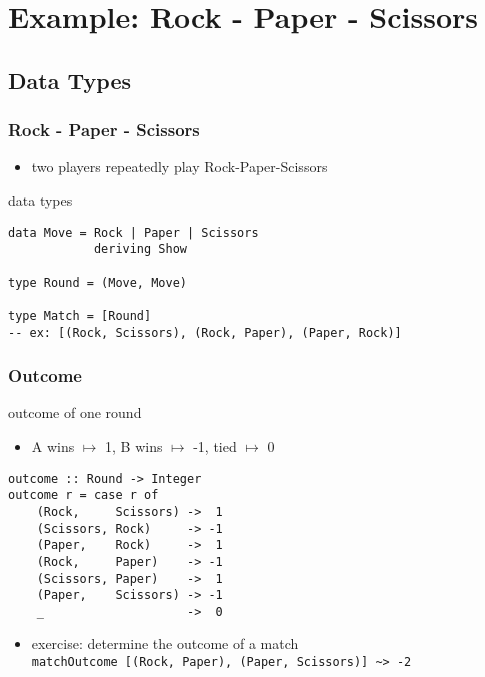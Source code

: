 \documentclass[dvipsnames]{beamer}
\theoremstyle{plain}
\begin{document}
\section{Example: Rock - Paper - Scissors}

\subsection{Data Types}

\begin{frame}[fragile]
  \frametitle{Rock - Paper - Scissors}

  \begin{itemize}
    \item two players repeatedly play Rock-Paper-Scissors
  \end{itemize}

  \begin{exampleblock}{data types}
    \begin{lstlisting}
data Move = Rock | Paper | Scissors
            deriving Show

type Round = (Move, Move)

type Match = [Round]
-- ex: [(Rock, Scissors), (Rock, Paper), (Paper, Rock)]
    \end{lstlisting}
  \end{exampleblock}
\end{frame}

\begin{frame}[fragile]
  \frametitle{Outcome}

  \begin{exampleblock}{outcome of one round}
    \begin{itemize}
      \item A wins $\mapsto$ 1, B wins $\mapsto$ -1, tied $\mapsto$ 0
    \end{itemize}
    \begin{lstlisting}
outcome :: Round -> Integer
outcome r = case r of
    (Rock,     Scissors) ->  1
    (Scissors, Rock)     -> -1
    (Paper,    Rock)     ->  1
    (Rock,     Paper)    -> -1
    (Scissors, Paper)    ->  1
    (Paper,    Scissors) -> -1
    _                    ->  0
    \end{lstlisting}
  \end{exampleblock}

  \pause
  \vspace{-12pt}
  \begin{itemize}
    \item exercise: determine the outcome of a match\\
      \lstinline|matchOutcome [(Rock, Paper), (Paper, Scissors)] ~> -2|
  \end{itemize}
\end{frame}
\end{document}
